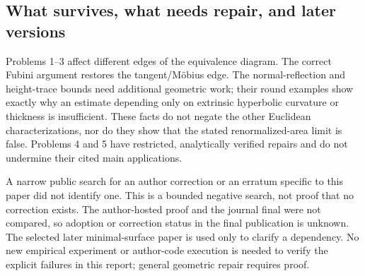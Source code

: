 \documentclass[10pt]{article}
\begin{document}
\subsection*{What survives, what needs repair, and later versions}
Problems 1–3 affect different edges of the equivalence diagram. The correct Fubini argument restores the tangent/Möbius edge. The normal-reflection and height-trace bounds need additional geometric work; their round examples show exactly why an estimate depending only on extrinsic hyperbolic curvature or thickness is insufficient. These facts do not negate the other Euclidean characterizations, nor do they show that the stated renormalized-area limit is false. Problems 4 and 5 have restricted, analytically verified repairs and do not undermine their cited main applications.\par
A narrow public search for an author correction or an erratum specific to this paper did not identify one. This is a bounded negative search, not proof that no correction exists. The author-hosted proof and the journal final were not compared, so adoption or correction status in the final publication is unknown. The selected later minimal-surface paper is used only to clarify a dependency. No new empirical experiment or author-code execution is needed to verify the explicit failures in this report; general geometric repair requires proof.\par
\end{document}

